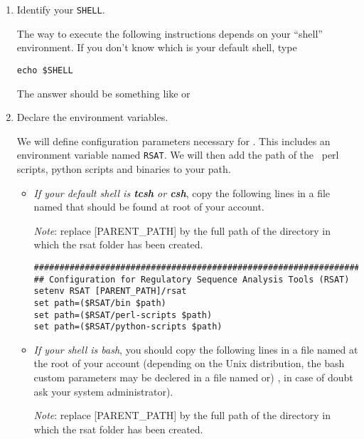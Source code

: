 \begin{enumerate}

\item Identify your \texttt{SHELL}.

  The way to execute the following instructions depends on your
  ``shell'' environment. If you don't know which is your default
  shell, type

\lstset{language=csh}

\begin{lstlisting}
echo $SHELL
\end{lstlisting}

The answer should be something like  or

\item Declare the \RSAT environment variables.

  We will define configuration parameters necessary for \RSAT.  This
  includes an environment variable named \texttt{RSAT}.  We will then
  add the path of the \RSAT \ perl scripts, python scripts and
  binaries to your path.

\begin{itemize}

\item \emph{If your default shell is \textbf{tcsh} or \textbf{csh}},
  copy the following lines in a file named  that should
  be found at root of your account.

  \emph{Note}: replace [PARENT\_PATH] by the full path of the directory
  in which the rsat folder has been created.

\begin{lstlisting}
################################################################
## Configuration for Regulatory Sequence Analysis Tools (RSAT)
setenv RSAT [PARENT_PATH]/rsat
set path=($RSAT/bin $path)
set path=($RSAT/perl-scripts $path)
set path=($RSAT/python-scripts $path)
\end{lstlisting}

\item \emph{If your shell is bash}, you should copy the following
  lines in a file named  at the root of your
  account (depending on the Unix distribution, the bash custom
  parameters may be declered in a file named  or)
  , in case of doubt ask your system administrator).

  \emph{Note}: replace [PARENT\_PATH] by the full path of the directory
  in which the rsat folder has been created.


\end{itemize}
\end{enumerate}
